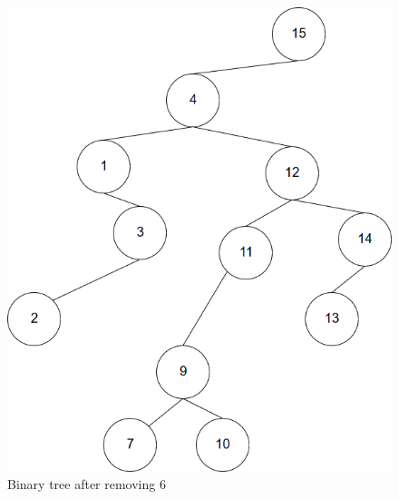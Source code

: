 \documentclass{article}
\begin{document}
\begin{enumerate}
\begin{figure}[H]
    \end{figure}
    \begin{figure}[H]
 	  \centering
 	  \caption{Binary tree after removing 6}
 	  \label{Trees:BinaryTreeR3}
	  \includegraphics[width=\textwidth]{BinaryR3}
    \end{figure}
    

\end{enumerate}
\end{document}
